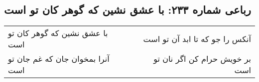 \begin{center}
\section*{رباعی شماره ۲۳۳: با عشق نشین که گوهر کان تو است}
\label{sec:0233}
\begin{longtable}{l p{0.5cm} r}
با عشق نشین که گوهر کان تو است
&&
آنکس را جو که تا ابد آن تو است
\\
آنرا بمخوان جان که غم جان تو است
&&
بر خویش حرام کن اگر نان تو است
\\
\end{longtable}
\end{center}

